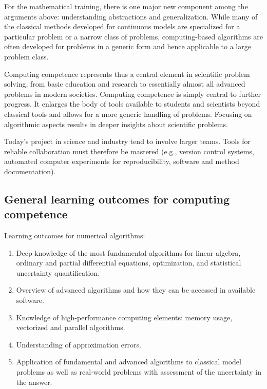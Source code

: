 \documentclass[%
oneside,                 %
final,                   %
10pt]{article}
\begin{document}
For the mathematical training, there is one major new component among the arguments above: understanding abstractions and generalization. While many of the classical methods developed for continuous models are specialized for a particular problem or a narrow class of problems, computing-based algorithms are often developed for problems in a generic form and hence applicable to a large problem class.


Computing competence represents thus a central element in scientific problem solving, from basic education and research to essentially almost all advanced problems in modern societies. Computing competence is simply central to further progress. It enlarges the body of tools available to students and scientists beyond classical tools and allows for a more generic handling of problems. Focusing on algorithmic aspects results in deeper insights about scientific problems.

Today's project in science and industry tend to involve larger teams. Tools for reliable collaboration must therefore be mastered (e.g., version control systems, automated computer experiments for reproducibility, software and method documentation).


\subsection*{General learning outcomes for computing competence}

Learning outcomes for numerical algorithms:

\begin{enumerate}
\item Deep knowledge of the most fundamental algorithms for linear algebra, ordinary and partial differential equations, optimization, and statistical uncertainty quantification.

\item Overview of advanced algorithms and how they can be accessed in available software.

\item Knowledge of high-performance computing elements: memory usage, vectorized and parallel algorithms.

\item Understanding of approximation errors.

\item Application of fundamental and advanced algorithms to classical model problems as well as real-world problems with assessment of the uncertainty in the answer.
\end{enumerate}
\end{document}
